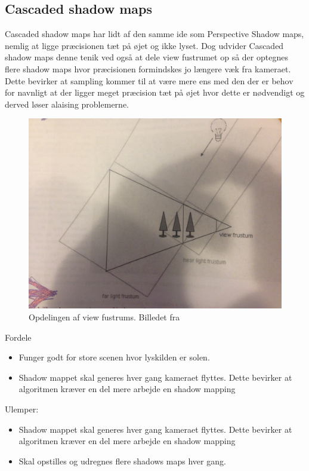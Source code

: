 \documentclass[11pt,a4paper]{article}
\begin{document}
\subsection{Cascaded shadow maps}

Cascaded shadow maps har lidt af den samme ide som Perspective Shadow maps, nemlig at ligge præcisionen tæt på øjet og ikke lyset. Dog udvider Cascaded shadow maps denne tenik ved også at dele view fustrumet op så der optegnes flere shadow maps hvor præcisionen formindskes jo længere væk fra kameraet.  Dette bevirker at sampling kommer til at være mere ens med den der er behov for navnligt at der ligger meget præcision tæt på øjet hvor dette er nødvendigt og derved løser alaising problemerne.

\begin{figure}[ht!]
\centering
\includegraphics[width=140mm]{img/CSSHMAP1.JPG}
\caption{Opdelingen af view fustrums. Billedet fra \cite{CSM}}
\label{shadowmapdesc}
\end{figure}

Fordele
\begin{itemize}
  \item Funger godt for store scenen hvor lyskilden er solen.
  \item Shadow mappet skal generes hver gang kameraet flyttes. Dette bevirker at algoritmen kræver en del mere arbejde en shadow mapping
\end{itemize}

Ulemper:
\begin{itemize}
  \item Shadow mappet skal generes hver gang kameraet flyttes. Dette bevirker at algoritmen kræver en del mere arbejde en shadow mapping
  \item Skal opstilles og udregnes flere shadows maps hver gang.
\end{itemize}
\end{document}

